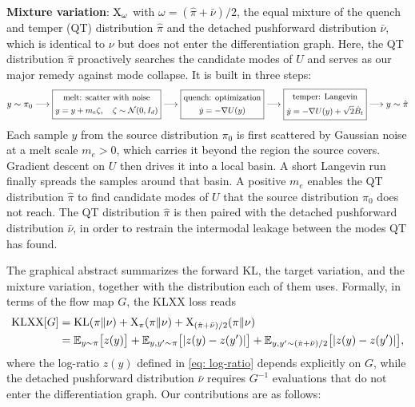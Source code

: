\documentclass{article}
\begin{document}
\textbf{Mixture variation}: $\mathrm{X}_\omega$ with $\omega = (\hat\pi + \bar\nu)/2$, the equal mixture of the quench and temper (QT) distribution $\hat\pi$ and the detached pushforward distribution $\bar\nu$, which is identical to $\nu$ but does not enter the differentiation graph. Here, the QT distribution $\hat\pi$ proactively searches the candidate modes of $U$ and serves as our major remedy against mode collapse. It is built in three steps:
	\begin{equation*}
		y\sim \pi_0 \longrightarrow \boxed{\small
		\begin{gathered}
			\text{melt: scatter with noise} \\
			y = y + m_e \zeta, \quad \zeta \sim \mathcal N(0,I_d)
		\end{gathered}
		} \longrightarrow \boxed{\small
		\begin{gathered}
			\text{quench: optimization} \\
			\dot y = -\nabla U(y)
		\end{gathered}
		} \longrightarrow \boxed{\small
		\begin{gathered}
			\text{temper: Langevin} \\
			\dot y = -\nabla U(y) + \sqrt{2}\dot B_t
		\end{gathered}
		} \longrightarrow y\sim \hat \pi
	\end{equation*}
Each sample $y$ from the source distribution $\pi_0$ is first scattered by Gaussian noise at a melt scale $m_e>0$, which carries it beyond the region the source covers. Gradient descent on $U$ then drives it into a local basin. A short Langevin run finally spreads the samples around that basin. A positive $m_e$ enables the QT distribution $\hat\pi$ to find candidate modes of $U$ that the source distribution $\pi_0$ does not reach. The QT distribution $\hat\pi$ is then paired with the detached pushforward distribution $\bar\nu$, in order to restrain the intermodal leakage between the modes QT has found.

The graphical abstract summarizes the forward KL, the target variation, and the mixture variation, together with the distribution each of them uses. Formally, in terms of the flow map $G$, the KLXX loss reads
\begin{align}
	\mathrm{KLXX}[G] & = \mathrm{KL}(\pi\|\nu) + \mathrm{X}_\pi(\pi\|\nu) + \mathrm{X}_{(\hat\pi+\bar\nu)/2}(\pi\|\nu) \notag \\
	& = \mathbb E_{y\sim\pi}\big[z(y)\big] + \mathbb E_{y,y'\sim\pi}\big[|z(y)-z(y')|\big] + \mathbb E_{y,y'\sim(\hat\pi+\bar\nu)/2}\big[|z(y)-z(y')|\big],
	\label{eq: KLXX-G}
\end{align}
where the log-ratio $z(y)$ defined in \eqref{eq: log-ratio} depends explicitly on $G$, while the detached pushforward distribution $\bar\nu$ requires $G^{-1}$ evaluations that do not enter the differentiation graph. Our contributions are as follows:
\end{document}

